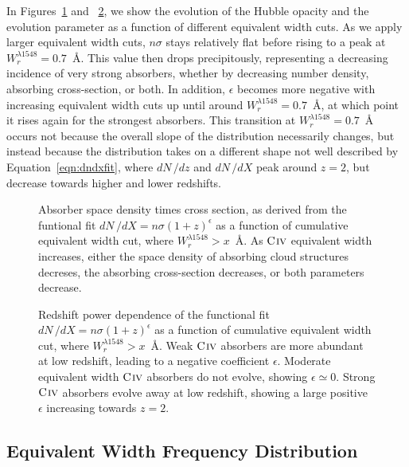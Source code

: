 \documentclass[linenumbers,twocolumn]{aastex61}
\begin{document}
In Figures~\ref{fig:nsigma} and ~\ref{fig:epsilon}, we show the evolution of the Hubble opacity and the evolution parameter as a function of different equivalent width cuts. As we apply larger equivalent width cuts, $n\sigma$ stays relatively flat before rising to a peak at $W_r^{\lambda1548} = 0.7$~{\AA}. This value then drops precipitously, representing a decreasing incidence of very strong {\CIV} absorbers, whether by decreasing number density, absorbing cross-section, or both. In addition, $\epsilon$ becomes more negative with increasing equivalent width cuts up until around $W_r^{\lambda1548} = 0.7$~{\AA}, at which point it rises again for the strongest {\CIV} absorbers. This transition at $W_r^{\lambda1548} = 0.7$~{\AA} occurs not because the overall slope of the distribution necessarily changes, but instead because the distribution takes on a different shape not well described by Equation~\ref{eqn:dndxfit}, where $dN\,/dz$ and $dN\,/dX$ peak around $z = 2$, but decrease towards higher and lower redshifts.

\begin{figure}[bth]
\caption{Absorber space density times cross section, as derived from the funtional fit $dN\,/dX = n\sigma (1 + z)^{\epsilon}$ as a function of cumulative equivalent width cut, where $W_r^{\lambda1548} > x$~{\AA}. As ${\hbox{{\rm C}\kern 0.1em{\sc iv}}}$ equivalent width increases, either the space density of absorbing cloud structures decreses, the absorbing cross-section decreases, or both parameters decrease.}
\label{fig:nsigma}
\end{figure}

\begin{figure}[bth]
\caption{Redshift power dependence of the functional fit $dN\,/dX = n\sigma (1 + z)^{\epsilon}$ as a function of cumulative equivalent width cut, where $W_r^{\lambda1548} > x$~{\AA}. Weak ${\hbox{{\rm C}\kern 0.1em{\sc iv}}}$ absorbers are more abundant at low redshift, leading to a negative coefficient $\epsilon$. Moderate equivalent width ${\hbox{{\rm C}\kern 0.1em{\sc iv}}}$ absorbers do not evolve, showing $\epsilon \simeq 0$. Strong ${\hbox{{\rm C}\kern 0.1em{\sc iv}}}$ absorbers evolve away at low redshift, showing a large positive $\epsilon$ increasing towards $z = 2$.}
\label{fig:epsilon}
\end{figure}

\subsection{Equivalent Width Frequency Distribution}
\label{sec:ewdistro}
\end{document}

